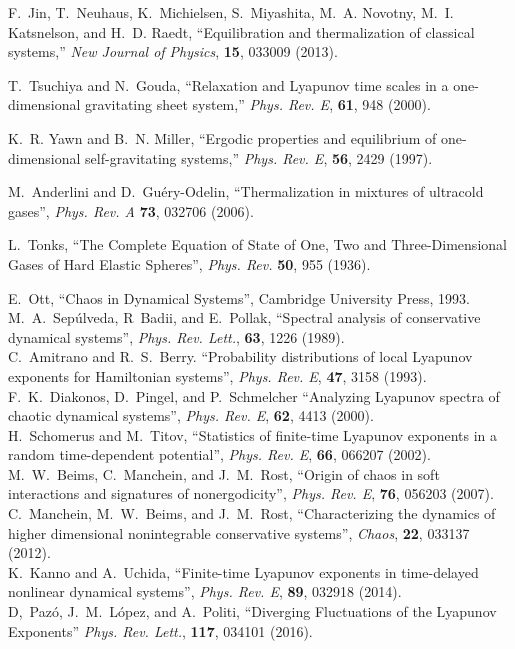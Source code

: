 \documentclass[a4paper, onecolumn]{revtex4-1}
\begin{document}
\begin{thebibliography}{1}

F.~Jin, T.~Neuhaus, K.~Michielsen, S.~Miyashita, M.~A. Novotny, M.~I.
  Katsnelson, and H.~D. Raedt, ``Equilibration and thermalization of classical
  systems,'' {\em New Journal of Physics}, {\bf 15}, 033009 (2013).



T.~Tsuchiya and N.~Gouda, ``Relaxation and Lyapunov time scales in a
  one-dimensional gravitating sheet system,'' {\em Phys. Rev. E}, {\bf 61}, 948 (2000).

 K.~R. Yawn and B.~N. Miller, ``Ergodic properties and equilibrium of
  one-dimensional self-gravitating systems,'' {\em Phys. Rev. E}, {\bf 56}, 2429 (1997).


 M.~Anderlini and D.~Gu\'ery-Odelin, ``Thermalization in
  mixtures of ultracold gases'', {\em Phys. Rev. A} {\bf 73}, 032706 (2006).


L.~Tonks, 
``The Complete Equation of State of One, Two and Three-Dimensional Gases of Hard Elastic Spheres'', 
{\em Phys. Rev.} {\bf 50}, 955 (1936). 
  

E.~Ott, ``Chaos in Dynamical Systems'', Cambridge University Press,  1993.
%
\\ 
%
M.~A.~Sep\'ulveda, R~Badii, and E.~Pollak, 
``Spectral analysis of conservative dynamical systems'', 
{\em Phys. Rev. Lett.}, {\bf 63}, 1226 (1989). 
%
\\ 
%
C.~Amitrano and R.~S.~Berry. 
``Probability distributions of local Lyapunov exponents for Hamiltonian systems'', 
{\em Phys. Rev. E}, {\bf 47}, 3158 (1993). 
%
\\ 
%
F.~K.~Diakonos, D.~Pingel, and P.~Schmelcher
``Analyzing Lyapunov spectra of chaotic dynamical systems'', 
{\em Phys. Rev. E}, {\bf 62}, 4413 (2000).
%
\\ 
%
H.~Schomerus and M.~Titov, 
``Statistics of finite-time Lyapunov exponents in a random time-dependent potential'', 
{\em Phys. Rev. E}, {\bf 66}, 066207 (2002). 
%
\\ 
%
M.~W.~Beims, C.~Manchein, and J.~M.~Rost, 
``Origin of chaos in soft interactions and signatures of nonergodicity'', 
{\em Phys. Rev. E}, {\bf 76}, 056203 (2007).
%
\\ 
%
C.~Manchein, M.~W.~Beims, and J.~M.~Rost, ``Characterizing the dynamics of higher dimensional
nonintegrable conservative systems'', {\em Chaos}, {\bf 22}, 033137 (2012).
%
\\ 
%
K.~Kanno and A.~Uchida, ``Finite-time Lyapunov exponents in time-delayed nonlinear dynamical
systems'',  {\em Phys. Rev. E}, {\bf 89}, 032918 (2014). 
%
\\ 
%
D,~Paz\'o, J.~M.~L\'opez, and A.~Politi, 
``Diverging Fluctuations of the Lyapunov Exponents'' 
{\em Phys. Rev. Lett.},  {\bf 117}, 034101 (2016). 


\end{thebibliography}




 
\end{document}
